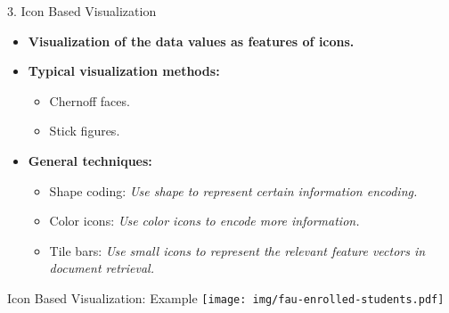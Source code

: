 \begin{frame}{3. Icon Based Visualization}
	\centering
	\begin{itemize}
		\item \textbf{Visualization of the data values as features of icons.}
		\item \textbf{Typical visualization methods:}
		      \begin{itemize}
			      \item Chernoff faces.
			      \item Stick figures.
		      \end{itemize}
		\item \textbf{General techniques:}
		      \begin{itemize}
			      \item Shape coding: \emph{Use shape to represent certain information encoding.}
			      \item Color icons: \emph{Use color icons to encode more information.}
			      \item Tile bars: \emph{Use small icons to represent the relevant feature vectors in document retrieval.}
		      \end{itemize}
	\end{itemize}
\end{frame}


\begin{frame}{Icon Based Visualization: Example}
	\centering
	\texttt{[image: img/fau-enrolled-students.pdf]}
\end{frame}

